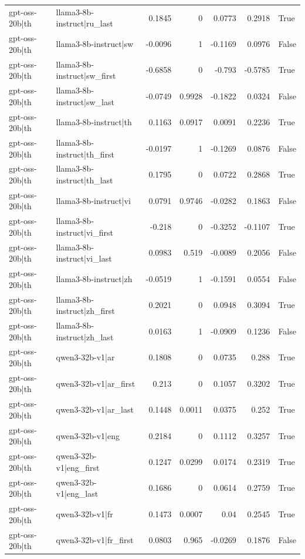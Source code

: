 \begin{table}
\begin{tabular}{l l r r r r l}
gpt-oss-20b|th & llama3-8b-instruct|ru_last & 0.1845 & 0 & 0.0773 & 0.2918 & True \\
gpt-oss-20b|th & llama3-8b-instruct|sw & -0.0096 & 1 & -0.1169 & 0.0976 & False \\
gpt-oss-20b|th & llama3-8b-instruct|sw_first & -0.6858 & 0 & -0.793 & -0.5785 & True \\
gpt-oss-20b|th & llama3-8b-instruct|sw_last & -0.0749 & 0.9928 & -0.1822 & 0.0324 & False \\
gpt-oss-20b|th & llama3-8b-instruct|th & 0.1163 & 0.0917 & 0.0091 & 0.2236 & True \\
gpt-oss-20b|th & llama3-8b-instruct|th_first & -0.0197 & 1 & -0.1269 & 0.0876 & False \\
gpt-oss-20b|th & llama3-8b-instruct|th_last & 0.1795 & 0 & 0.0722 & 0.2868 & True \\
gpt-oss-20b|th & llama3-8b-instruct|vi & 0.0791 & 0.9746 & -0.0282 & 0.1863 & False \\
gpt-oss-20b|th & llama3-8b-instruct|vi_first & -0.218 & 0 & -0.3252 & -0.1107 & True \\
gpt-oss-20b|th & llama3-8b-instruct|vi_last & 0.0983 & 0.519 & -0.0089 & 0.2056 & False \\
gpt-oss-20b|th & llama3-8b-instruct|zh & -0.0519 & 1 & -0.1591 & 0.0554 & False \\
gpt-oss-20b|th & llama3-8b-instruct|zh_first & 0.2021 & 0 & 0.0948 & 0.3094 & True \\
gpt-oss-20b|th & llama3-8b-instruct|zh_last & 0.0163 & 1 & -0.0909 & 0.1236 & False \\
gpt-oss-20b|th & qwen3-32b-v1|ar & 0.1808 & 0 & 0.0735 & 0.288 & True \\
gpt-oss-20b|th & qwen3-32b-v1|ar_first & 0.213 & 0 & 0.1057 & 0.3202 & True \\
gpt-oss-20b|th & qwen3-32b-v1|ar_last & 0.1448 & 0.0011 & 0.0375 & 0.252 & True \\
gpt-oss-20b|th & qwen3-32b-v1|eng & 0.2184 & 0 & 0.1112 & 0.3257 & True \\
gpt-oss-20b|th & qwen3-32b-v1|eng_first & 0.1247 & 0.0299 & 0.0174 & 0.2319 & True \\
gpt-oss-20b|th & qwen3-32b-v1|eng_last & 0.1686 & 0 & 0.0614 & 0.2759 & True \\
gpt-oss-20b|th & qwen3-32b-v1|fr & 0.1473 & 0.0007 & 0.04 & 0.2545 & True \\
gpt-oss-20b|th & qwen3-32b-v1|fr_first & 0.0803 & 0.965 & -0.0269 & 0.1876 & False \\

\end{tabular}
\end{table}
